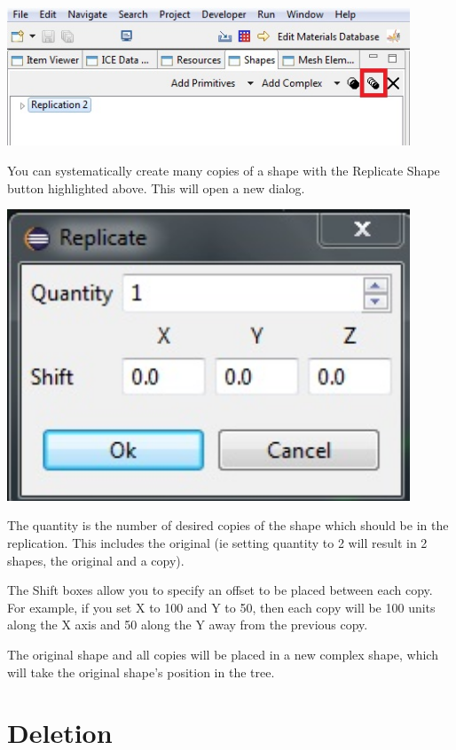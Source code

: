 \begin{center}
\includegraphics[width=12cm]{images/GeometryReplicateShape.jpg}
\end{center}

You can systematically create many copies of a shape with the Replicate Shape
button highlighted above. This will open a new dialog.

\begin{center}
\includegraphics[width=12cm]{images/GeometryReplicateDialog.jpg}
\end{center}

The quantity is the number of desired copies of the shape which should be in the
replication. This includes the original (ie setting quantity to 2 will result in
2 shapes, the original and a copy).

The Shift boxes allow you to specify an offset to be placed between each copy.
For example, if you set X to 100 and Y to 50, then each copy will be 100 units
along the X axis and 50 along the Y away from the previous copy. 

The original shape and all copies will be placed in a new complex shape, which
will take the original shape's position in the tree.

\section{Deletion}

